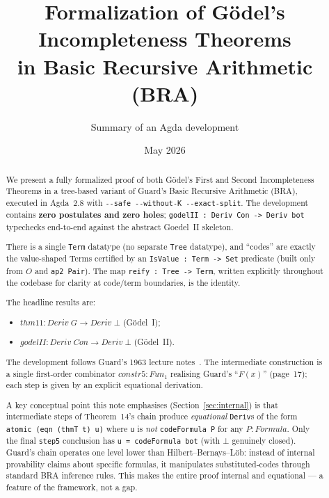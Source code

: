 \documentclass[11pt]{article}
\title{Formalization of G\"odel's Incompleteness Theorems\\
  in Basic Recursive Arithmetic (BRA)}
\author{Summary of an Agda development}
\date{May 2026}
\begin{document}
\maketitle

\begin{abstract}
We present a fully formalized proof of both G\"odel's First and Second
Incompleteness Theorems in a tree-based variant of Guard's Basic
Recursive Arithmetic (BRA), executed in Agda~2.8 with
\verb|--safe --without-K --exact-split|.  The development contains
\textbf{zero postulates and zero holes}; \verb|godelII : Deriv Con -> Deriv bot|
typechecks end-to-end against the abstract Goedel~II skeleton.

There is a single \verb|Term| datatype (no separate \verb|Tree|
datatype), and ``codes'' are exactly the value-shaped Terms certified
by an \verb|IsValue : Term -> Set| predicate (built only from $O$ and
\verb|ap2 Pair|).  The map \verb|reify : Tree -> Term|, written
explicitly throughout the codebase for clarity at code/term
boundaries, is the identity.

The headline results are:
\begin{itemize}
  \item $\mathit{thm11} : \mathit{Deriv}\;G \to \mathit{Deriv}\;\bot$
        (G\"odel~I);
  \item $\mathit{godelII} : \mathit{Deriv}\;\mathit{Con} \to \mathit{Deriv}\;\bot$
        (G\"odel~II).
\end{itemize}
The development follows Guard's 1963 lecture
notes~\cite{guard1963}.  The intermediate construction is a single
first-order combinator $\mathit{constr5} : \mathit{Fun}_1$ realising
Guard's ``$F(x)$'' (page~17); each step is given by an explicit
equational derivation.

A key conceptual point this note emphasises (Section~\ref{sec:internal})
is that intermediate steps of Theorem~14's chain produce
\emph{equational} \verb|Deriv|s of the form
\verb|atomic (eqn (thmT t) u)| where \verb|u| is \emph{not}
\verb|codeFormula P| for any $P : \mathit{Formula}$.  Only the final
\verb|step5| conclusion has \verb|u = codeFormula bot| (with $\bot$
genuinely closed).  Guard's chain operates one level lower than
Hilbert--Bernays--L\"ob: instead of internal provability claims about
specific formulas, it manipulates substituted-codes through standard
BRA inference rules.  This makes the entire proof internal and
equational --- a feature of the framework, not a gap.
\end{abstract}
\end{document}
